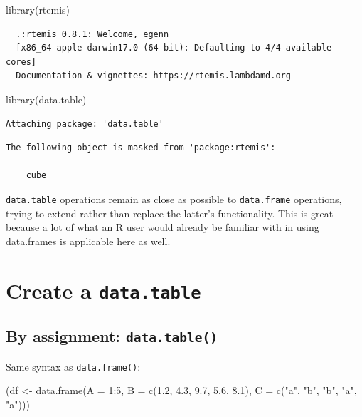 \documentclass[
]{book}
\newenvironment{Shaded}{\begin{snugshade}}{\end{snugshade}}
\newcommand{\AttributeTok}[1]{\textcolor[rgb]{0.77,0.63,0.00}{#1}}
\newcommand{\DecValTok}[1]{\textcolor[rgb]{0.00,0.00,0.81}{#1}}
\newcommand{\FloatTok}[1]{\textcolor[rgb]{0.00,0.00,0.81}{#1}}
\newcommand{\FunctionTok}[1]{\textcolor[rgb]{0.00,0.00,0.00}{#1}}
\newcommand{\NormalTok}[1]{#1}
\newcommand{\OtherTok}[1]{\textcolor[rgb]{0.56,0.35,0.01}{#1}}
\newcommand{\SpecialCharTok}[1]{\textcolor[rgb]{0.00,0.00,0.00}{#1}}
\newcommand{\StringTok}[1]{\textcolor[rgb]{0.31,0.60,0.02}{#1}}
\begin{document}
\begin{Shaded}
\begin{Highlighting}[]
\FunctionTok{library}\NormalTok{(rtemis)}
\end{Highlighting}
\end{Shaded}

\begin{verbatim}
  .:rtemis 0.8.1: Welcome, egenn
  [x86_64-apple-darwin17.0 (64-bit): Defaulting to 4/4 available cores]
  Documentation & vignettes: https://rtemis.lambdamd.org
\end{verbatim}

\begin{Shaded}
\begin{Highlighting}[]
\FunctionTok{library}\NormalTok{(data.table)}
\end{Highlighting}
\end{Shaded}

\begin{verbatim}
Attaching package: 'data.table'
\end{verbatim}

\begin{verbatim}
The following object is masked from 'package:rtemis':

    cube
\end{verbatim}

\texttt{data.table} operations remain as close as possible to \texttt{data.frame} operations, trying to extend rather than replace the latter's functionality. This is great because a lot of what an R user would already be familiar with in using data.frames is applicable here as well.

\hypertarget{create-a-data.table}{%
\section{\texorpdfstring{Create a \texttt{data.table}}{Create a data.table}}\label{create-a-data.table}}

\hypertarget{by-assignment-data.table}{%
\subsection{\texorpdfstring{By assignment: \texttt{data.table()}}{By assignment: data.table()}}\label{by-assignment-data.table}}

Same syntax as \texttt{data.frame()}:

\begin{Shaded}
\begin{Highlighting}[]
\NormalTok{(df }\OtherTok{\textless{}{-}} \FunctionTok{data.frame}\NormalTok{(}\AttributeTok{A =} \DecValTok{1}\SpecialCharTok{:}\DecValTok{5}\NormalTok{,}
                  \AttributeTok{B =} \FunctionTok{c}\NormalTok{(}\FloatTok{1.2}\NormalTok{, }\FloatTok{4.3}\NormalTok{, }\FloatTok{9.7}\NormalTok{, }\FloatTok{5.6}\NormalTok{, }\FloatTok{8.1}\NormalTok{),}
                  \AttributeTok{C =} \FunctionTok{c}\NormalTok{(}\StringTok{"a"}\NormalTok{, }\StringTok{"b"}\NormalTok{, }\StringTok{"b"}\NormalTok{, }\StringTok{"a"}\NormalTok{, }\StringTok{"a"}\NormalTok{)))}
\end{Highlighting}
\end{Shaded}
\end{document}

